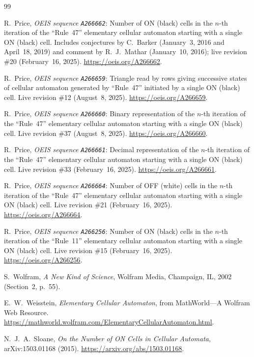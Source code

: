 \documentclass[11pt]{article}
\theoremstyle{definition}
\newcommand{\seq}[1]{\texttt{#1}}
\begin{document}
{\small
\begin{thebibliography}{99}\setlength{\itemsep}{2pt}
\raggedright

R.\ Price, \emph{OEIS sequence \seq{A266662}}: Number of ON (black) cells in the $n$-th iteration of the ``Rule~47'' elementary cellular automaton starting with a single ON (black) cell. Includes conjectures by C.\ Barker (January~3, 2016 and April~18, 2019) and comment by R.~J.\ Mathar (January~10, 2016); live revision \#20 (February~16, 2025). \url{https://oeis.org/A266662}.

R.\ Price, \emph{OEIS sequence \seq{A266659}}: Triangle read by rows giving successive states of cellular automaton generated by ``Rule~47'' initiated by a single ON (black) cell. Live revision \#12 (August~8, 2025). \url{https://oeis.org/A266659}.

R.\ Price, \emph{OEIS sequence \seq{A266660}}: Binary representation of the $n$-th iteration of the ``Rule~47'' elementary cellular automaton starting with a single ON (black) cell. Live revision \#37 (August~8, 2025). \url{https://oeis.org/A266660}.

R.\ Price, \emph{OEIS sequence \seq{A266661}}: Decimal representation of the $n$-th iteration of the ``Rule~47'' elementary cellular automaton starting with a single ON (black) cell. Live revision \#33 (February~16, 2025). \url{https://oeis.org/A266661}.

R.\ Price, \emph{OEIS sequence \seq{A266664}}: Number of OFF (white) cells in the $n$-th iteration of the ``Rule~47'' elementary cellular automaton starting with a single ON (black) cell. Live revision \#21 (February~16, 2025). \url{https://oeis.org/A266664}.

R.\ Price, \emph{OEIS sequence \seq{A266256}}: Number of ON (black) cells in the $n$-th iteration of the ``Rule~11'' elementary cellular automaton starting with a single ON (black) cell. Live revision \#15 (February~16, 2025). \url{https://oeis.org/A266256}.

S.\ Wolfram, \emph{A New Kind of Science}, Wolfram Media, Champaign, IL, 2002 (Section~2, p.~55).

E.~W.\ Weisstein, \emph{Elementary Cellular Automaton}, from MathWorld---A Wolfram Web Resource. \url{https://mathworld.wolfram.com/ElementaryCellularAutomaton.html}.

N.~J.~A.\ Sloane, \emph{On the Number of ON Cells in Cellular Automata}, arXiv:1503.01168 (2015). \url{https://arxiv.org/abs/1503.01168}.

\end{thebibliography}
}
\end{document}
